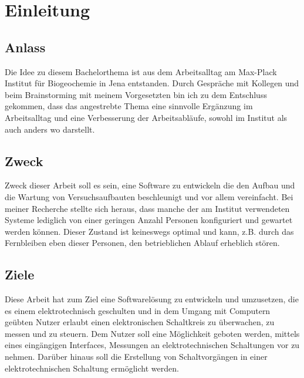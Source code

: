 \chapter{Einleitung}
\section{Anlass}
Die Idee zu diesem Bachelorthema ist aus dem Arbeitsalltag am Max-Plack Institut
für Biogeochemie in Jena entstanden. Durch Gespräche mit Kollegen und beim
\gls{Brainstorming} mit meinem Vorgesetzten bin ich zu dem Entschluss gekommen, 
dass das angestrebte Thema eine sinnvolle Ergänzung im Arbeitsalltag und eine
Verbesserung der Arbeitsabläufe, sowohl im Institut als auch anders wo
darstellt.

\section{Zweck}
Zweck dieser Arbeit soll es sein, eine Software zu entwickeln die den Aufbau und
die Wartung von Versuchsaufbauten beschleunigt und vor allem vereinfacht. Bei meiner Recherche stellte sich heraus, dass manche der am Institut
verwendeten Systeme lediglich von einer geringen Anzahl Personen konfiguriert und gewartet werden können. Dieser Zustand ist keineswegs optimal und kann, z.B. durch das Fernbleiben eben dieser Personen, den betrieblichen Ablauf erheblich stören.
\section{Ziele}
Diese Arbeit hat zum Ziel eine Softwarelösung zu entwickeln und umzusetzen, die 
es einem elektrotechnisch geschulten und in dem Umgang mit Computern geübten 
Nutzer erlaubt einen elektronischen Schaltkreis zu überwachen, zu messen und zu 
steuern. Dem Nutzer soll eine Möglichkeit geboten werden, mittels eines eingängigen Interfaces, Messungen an elektrotechnischen Schaltungen vor zu nehmen. Darüber hinaus soll die Erstellung von Schaltvorgängen in einer elektrotechnischen Schaltung ermöglicht werden.
